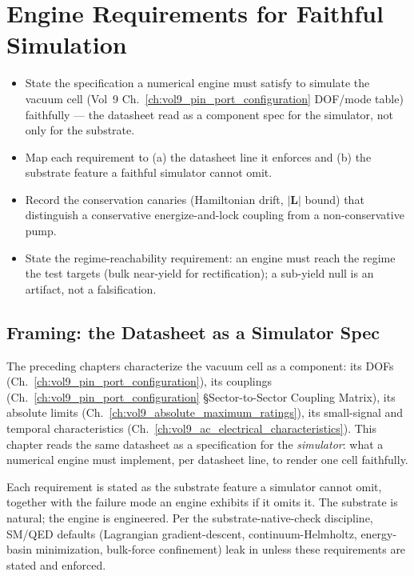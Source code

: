 \chapter{Engine Requirements for Faithful Simulation}
\label{ch:vol9_engine_requirements}

\begin{objectivebox}
\begin{itemize}
    \item State the specification a numerical engine must satisfy to simulate the vacuum cell (Vol~9 Ch.~\ref{ch:vol9_pin_port_configuration} DOF/mode table) faithfully --- the datasheet read as a component spec for the simulator, not only for the substrate.
    \item Map each requirement to (a) the datasheet line it enforces and (b) the substrate feature a faithful simulator cannot omit.
    \item Record the conservation canaries (Hamiltonian drift, $|\mathbf{L}|$ bound) that distinguish a conservative energize-and-lock coupling from a non-conservative pump.
    \item State the regime-reachability requirement: an engine must reach the regime the test targets (bulk near-yield for rectification); a sub-yield null is an artifact, not a falsification.
\end{itemize}
\end{objectivebox}

\section{Framing: the Datasheet as a Simulator Spec}
\label{sec:vol9_engine_framing}

The preceding chapters characterize the vacuum cell as a component: its DOFs (Ch.~\ref{ch:vol9_pin_port_configuration}), its couplings (Ch.~\ref{ch:vol9_pin_port_configuration} \S Sector-to-Sector Coupling Matrix), its absolute limits (Ch.~\ref{ch:vol9_absolute_maximum_ratings}), its small-signal and temporal characteristics (Ch.~\ref{ch:vol9_ac_electrical_characteristics}). This chapter reads the same datasheet as a specification for the \emph{simulator}: what a numerical engine must implement, per datasheet line, to render one cell faithfully.

Each requirement is stated as the substrate feature a simulator cannot omit, together with the failure mode an engine exhibits if it omits it. The substrate is natural; the engine is engineered. Per the substrate-native-check discipline, SM/QED defaults (Lagrangian gradient-descent, continuum-Helmholtz, energy-basin minimization, bulk-force confinement) leak in unless these requirements are stated and enforced.

